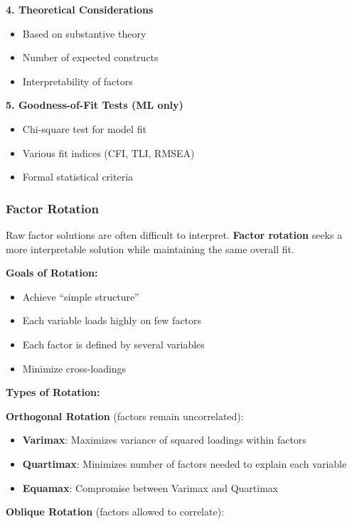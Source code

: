 \documentclass[
]{article}
\begin{document}
\textbf{4. Theoretical Considerations}

\begin{itemize}
\item
  Based on substantive theory
\item
  Number of expected constructs
\item
  Interpretability of factors
\end{itemize}

\textbf{5. Goodness-of-Fit Tests (ML only)}

\begin{itemize}
\item
  Chi-square test for model fit
\item
  Various fit indices (CFI, TLI, RMSEA)
\item
  Formal statistical criteria
\end{itemize}

\subsubsection{Factor Rotation}

Raw factor solutions are often difficult to interpret. \textbf{Factor
rotation} seeks a more interpretable solution while maintaining the same
overall fit.

\textbf{Goals of Rotation:}

\begin{itemize}
\item
  Achieve ``simple structure''
\item
  Each variable loads highly on few factors
\item
  Each factor is defined by several variables
\item
  Minimize cross-loadings
\end{itemize}

\textbf{Types of Rotation:}

\textbf{Orthogonal Rotation} (factors remain uncorrelated):

\begin{itemize}
\item
  \textbf{Varimax}: Maximizes variance of squared loadings within
  factors
\item
  \textbf{Quartimax}: Minimizes number of factors needed to explain each
  variable
\item
  \textbf{Equamax}: Compromise between Varimax and Quartimax
\end{itemize}

\textbf{Oblique Rotation} (factors allowed to correlate):
\end{document}
